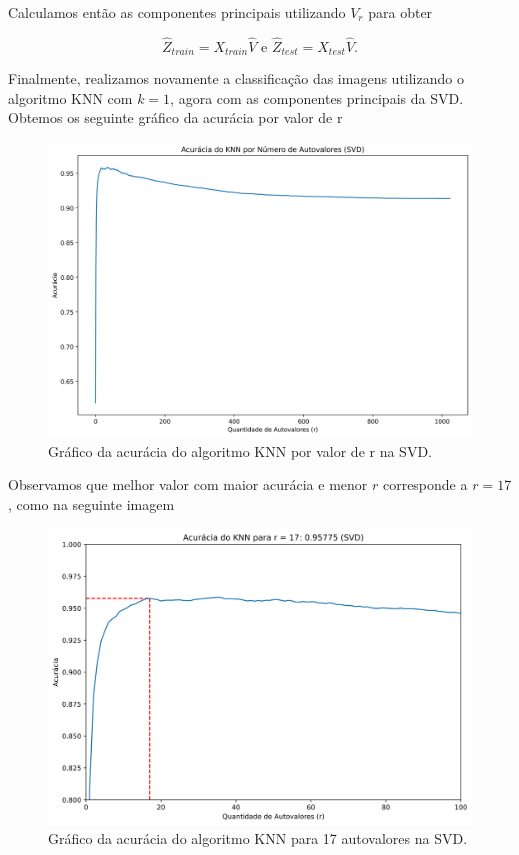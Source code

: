 \documentclass[a4paper, 12pt]{article}
\theoremstyle{definition}
\theoremstyle{remark}
\begin{document}
Calculamos então as componentes principais utilizando $V_r$ para obter

$$\hat{Z}_{train} = X_{train}\hat{V} \text{ e } \hat{Z}_{test} = X_{test}\hat{V}.$$

Finalmente, realizamos novamente a classificação das imagens utilizando o algoritmo KNN com $k = 1$, agora com as componentes principais da SVD. Obtemos os seguinte gráfico da acurácia por valor de r

\begin{figure}[H]
  \centering
  \includegraphics[width=11.5cm]{acuracia_svd}
  \caption{Gráfico da acurácia do algoritmo KNN por valor de r na SVD.}
\end{figure}

Observamos que melhor valor com maior acurácia e menor $r$ corresponde a $r = 17$, como na seguinte imagem

\begin{figure}[H]
  \centering
  \includegraphics[width=11.5cm]{acuracia_svd_17}
  \caption{Gráfico da acurácia do algoritmo KNN para 17 autovalores na SVD.}
\end{figure}
\end{document}
